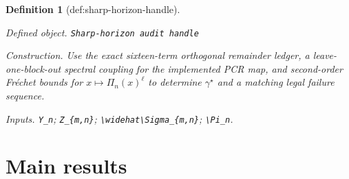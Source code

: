 \documentclass{article}
\newtheorem{definition}{Definition}
\begin{document}
\begin{definition}[def:sharp-horizon-handle]\label{def:sharp-horizon-handle}
\par\smallskip\noindent\emph{Defined object.} \texttt{Sharp-\allowbreak{}horizon audit handle}
\par\smallskip\noindent\emph{Construction.} Use the exact sixteen-term orthogonal remainder ledger, a leave-one-block-out spectral coupling for the implemented PCR map, and second-order Fr\'{e}chet bounds for \(x\mapsto\Pi_n(x)^\ell\) to determine \(\gamma^{\star}\) and a matching legal failure sequence.
\par\smallskip\noindent\emph{Inputs.} \texttt{Y\_\allowbreak{}n}; \texttt{Z\_\allowbreak{}\{m,\allowbreak{}n\}\allowbreak{}}; \texttt{\textbackslash{}\allowbreak{}widehat\textbackslash{}\allowbreak{}Sigma\_\allowbreak{}\{m,\allowbreak{}n\}\allowbreak{}}; \texttt{\textbackslash{}\allowbreak{}Pi\_\allowbreak{}n}.
\end{definition}

\section{Main results}
\end{document}
